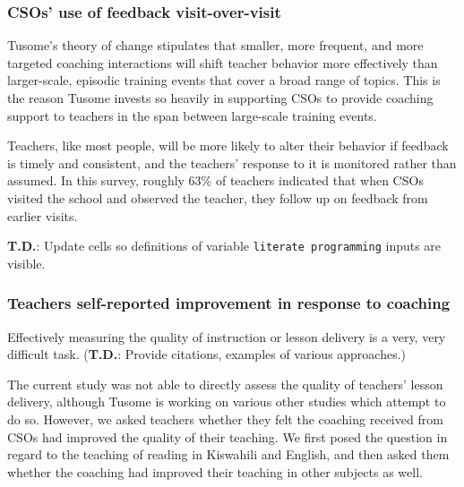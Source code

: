 \documentclass[11pt]{article}
\begin{document}
    \hypertarget{csos-use-of-feedback-visit-over-visit}{%
\subsubsection{CSOs' use of feedback
visit-over-visit}\label{csos-use-of-feedback-visit-over-visit}}

Tusome's theory of change stipulates that smaller, more frequent, and
more targeted coaching interactions will shift teacher behavior more
effectively than larger-scale, episodic training events that cover a
broad range of topics. This is the reason Tusome invests so heavily in
supporting CSOs to provide coaching support to teachers in the span
between large-scale training events.

Teachers, like most people, will be more likely to alter their behavior
if feedback is timely and consistent, and the teachers' response to it
is monitored rather than assumed. In this survey, roughly 63\% of
teachers indicated that when CSOs visited the school and observed the
teacher, they follow up on feedback from earlier visits.

    \textbf{T.D.}: { Update cells so definitions of variable
\texttt{literate\ programming} inputs are visible.}

    \hypertarget{teachers-self-reported-improvement-in-response-to-coaching}{%
\subsubsection{Teachers self-reported improvement in response to
coaching}\label{teachers-self-reported-improvement-in-response-to-coaching}}

Effectively measuring the quality of instruction or lesson delivery is a
very, very difficult task. (\textbf{T.D.}: { Provide citations, examples
of various approaches.})

The current study was not able to directly assess the quality of
teachers' lesson delivery, although Tusome is working on various other
studies which attempt to do so. However, we asked teachers whether they
felt the coaching received from CSOs had improved the quality of their
teaching. We first posed the question in regard to the teaching of
reading in Kiswahili and English, and then asked them whether the
coaching had improved their teaching in other subjects as well.
\end{document}
